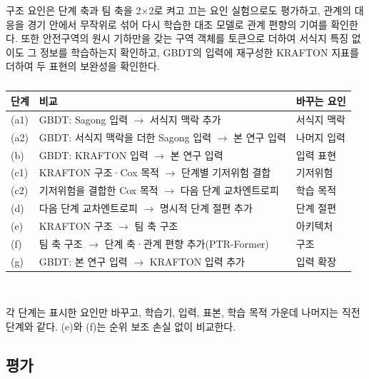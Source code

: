 구조 요인은 단계 축과 팀 축을 2$\times$2로 켜고 끄는 요인 실험으로도 평가하고, 관계의 대응을 경기 안에서 무작위로 섞어 다시 학습한 대조 모델로 관계 편향의 기여를 확인한다.
또한 안전구역의 원시 기하만을 갖는 구역 객체를 토큰으로 더하여 서식지 특징 없이도 그 정보를 학습하는지 확인하고, GBDT의 입력에 재구성한 KRAFTON 지표를 더하여 두 표현의 보완성을 확인한다.

\begin{table}[t]
\centering
\caption{}
\label{tab:ladder}
\footnotesize
\setlength{\tabcolsep}{3pt}
\begin{tabular}{p{0.6cm}p{4.9cm}p{1.9cm}}
\hline
단계 & 비교 & 바꾸는 요인 \\
\hline
(a1) & GBDT: Sagong 입력 $\rightarrow$ 서식지 맥락 추가 & 서식지 맥락 \\
(a2) & GBDT: 서식지 맥락을 더한 Sagong 입력 $\rightarrow$ 본 연구 입력 & 나머지 입력 \\
(b) & GBDT: KRAFTON 입력 $\rightarrow$ 본 연구 입력 & 입력 표현 \\
(c1) & KRAFTON 구조·Cox 목적 $\rightarrow$ 단계별 기저위험 결합 & 기저위험 \\
(c2) & 기저위험을 결합한 Cox 목적 $\rightarrow$ 다음 단계 교차엔트로피 & 학습 목적 \\
(d) & 다음 단계 교차엔트로피 $\rightarrow$ 명시적 단계 절편 추가 & 단계 절편 \\
(e) & KRAFTON 구조 $\rightarrow$ 팀 축 구조 & 아키텍처 \\
(f) & 팀 축 구조 $\rightarrow$ 단계 축·관계 편향 추가(PTR-Former) & 구조 \\
(g) & GBDT: 본 연구 입력 $\rightarrow$ KRAFTON 입력 추가 & 입력 확장 \\
\hline
\end{tabular}
\\[2pt]
\parbox{\columnwidth}{\scriptsize 각 단계는 표시한 요인만 바꾸고, 학습기, 입력, 표본, 학습 목적 가운데 나머지는 직전 단계와 같다. (e)와 (f)는 순위 보조 손실 없이 비교한다.}
\end{table}

\subsection{평가}
\label{sec:method:evaluation}


